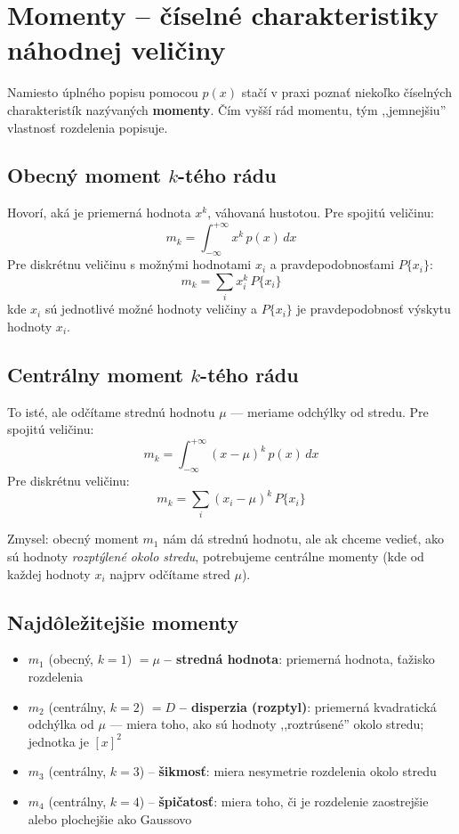 \section{Momenty -- číselné charakteristiky náhodnej veličiny}

Namiesto úplného popisu pomocou $p(x)$ stačí v praxi poznať niekoľko
číselných charakteristík nazývaných \textbf{momenty}. Čím vyšší rád momentu,
tým ,,jemnejšiu'' vlastnosť rozdelenia popisuje.

\subsection{Obecný moment $k$-tého rádu}

Hovorí, aká je priemerná hodnota $x^k$, váhovaná hustotou. Pre spojitú
veličinu:
\[
  m_k = \int_{-\infty}^{+\infty} x^k \, p(x)\, dx
\]
Pre diskrétnu veličinu s možnými hodnotami $x_i$ a pravdepodobnosťami
$P\{x_i\}$:
\[
  m_k = \sum_{i} x_i^k \, P\{x_i\}
\]
kde $x_i$ sú jednotlivé možné hodnoty veličiny a $P\{x_i\}$ je pravdepodobnosť
výskytu hodnoty $x_i$.

\subsection{Centrálny moment $k$-tého rádu}

To isté, ale odčítame strednú hodnotu $\mu$ --- meriame odchýlky od stredu.
Pre spojitú veličinu:
\[
  m_k = \int_{-\infty}^{+\infty} (x - \mu)^k \, p(x)\, dx
\]
Pre diskrétnu veličinu:
\[
  m_k = \sum_{i} (x_i - \mu)^k \, P\{x_i\}
\]

Zmysel: obecný moment $m_1$ nám dá strednú hodnotu, ale ak chceme vedieť, ako
sú hodnoty \emph{rozptýlené okolo stredu}, potrebujeme centrálne momenty (kde
od každej hodnoty $x_i$ najprv odčítame stred $\mu$).

\subsection{Najdôležitejšie momenty}

\begin{itemize}
  \item $m_1$ (obecný, $k=1$) $= \mu$ \textbf{-- stredná hodnota}: priemerná
        hodnota, ťažisko rozdelenia
  \item $m_2$ (centrálny, $k=2$) $= D$ \textbf{-- disperzia (rozptyl)}: priemerná
        kvadratická odchýlka od $\mu$ --- miera toho, ako sú hodnoty
        ,,roztrúsené'' okolo stredu; jednotka je $[x]^2$
  \item $m_3$ (centrálny, $k=3$) -- \textbf{šikmosť}: miera nesymetrie
        rozdelenia okolo stredu
  \item $m_4$ (centrálny, $k=4$) -- \textbf{špičatosť}: miera toho, či je
        rozdelenie zaostrejšie alebo plochejšie ako Gaussovo
\end{itemize}


